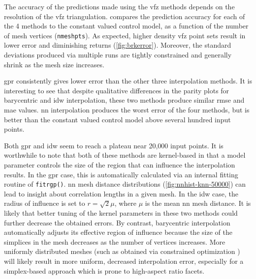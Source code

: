 \documentclass[preprint,12pt]{elsarticle}
\begin{document}
The accuracy of the predictions made using the \gls{vfz} methods depends on the resolution of the \gls{vfz} triangulation.  compares the prediction accuracy for each of the 4 methods to the constant valued control model, as a function of the number of mesh vertices (\texttt{nmeshpts}). As expected, higher density \gls{vfz} point sets result in lower error and diminishing returns (\cref{fig:brkerror}). Moreover, the standard deviations produced via multiple runs are tightly constrained and generally shrink as the mesh size increases. 

\Gls{gpr} consistently gives lower error than the other three interpolation methods. It is interesting to see that despite qualitative differences in the parity plots for barycentric and \gls{idw} interpolation, these two methods produce similar \gls{rmse} and \gls{mae} values. \Gls{nn} interpolation produces the worst error of the four methods, but is better than the constant valued control model above several hundred input points. 

Both \gls{gpr} and \gls{idw} seem to reach a plateau near 20,000 input points. It is worthwhile to note that both of these methods are kernel-based in that a model parameter controls the size of the region that can influence the interpolation results. In the \gls{gpr} case, this is automatically calculated via an internal fitting routine of \texttt{fitrgp()}. \gls{nn} mesh distance distributions (\cref{fig:nnhist-knn-50000}) can lead to insight about correlation lengths in a given mesh. In the \gls{idw} case, the radius of influence is set to $r=\sqrt{2} \mu$, where $\mu$ is the mean \gls{nn} mesh distance. It is likely that better tuning of the kernel parameters in these two methods could further decrease the obtained errors. By contrast, barycentric interpolation automatically adjusts its effective region of influence because the size of the simplices in the mesh decreases as the number of vertices increases. More uniformly distributed meshes (such as obtained via constrained optimization \cite{dolanBenchmarkingOptimizationSoftware2004,ConstrainedElectrostaticNonlinear2020}) will likely result in more uniform, decreased interpolation error, especially for a simplex-based approach which is prone to high-aspect ratio facets. %

\end{document}
